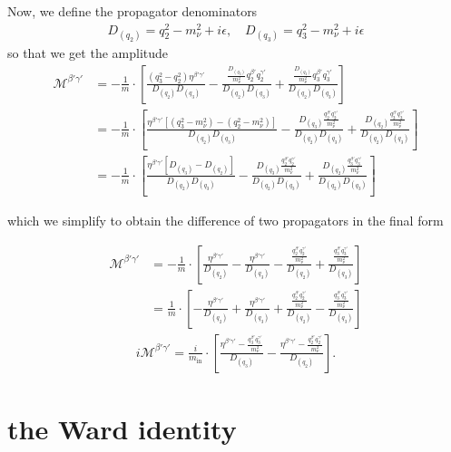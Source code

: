 \documentclass[12pt]{article}
\numberwithin{figure}{section}
\numberwithin{table}{section}
\newcommand{\eps}{\epsilon}
\newcommand{\paren}[1]{\left(#1\right)}
\newcommand{\bracket}[1]{\left[#1\right]}
\begin{document}
Now, we define the propagator denominators
\begin{align*}
\boxed{
D_{(q_2)} = q_2^2-m_\nu^2+i\eps, \quad D_{(q_3)} = q_3^2-m_\nu^2+i\eps}
\end{align*}
so that we get the amplitude
\begin{align*}
     \mathcal{M}^{\beta'\gamma'}&=  -\frac{1}{m}\cdot \bracket{\frac{\paren{q_3^2-q_2^2}\eta^{\beta'\gamma'} }{D_{(q_2)}D_{(q_3)}} -  \frac{\frac{D_{(q_3)}}{m_\nu^2}  q_2^{\beta'}q_2^{\gamma'}  }{D_{(q_2)}D_{(q_3)}} + \frac{\frac{D_{(q_2)}}{m_\nu^2}  q_3^{\beta'}q_3^{\gamma'}  }{D_{(q_2)}D_{(q_3)}}}\\
    &= -\frac{1}{m}\cdot \bracket{\frac{\eta^{\beta'\gamma'}\bracket{(q_3^2-m_\nu^2)-(q_2^2-m_\nu^2)}}{D_{(q_2)}D_{(q_3)} }-\frac{D_{(q_3)}\frac{q_2^{\beta'}q_2^{\gamma'}}{m_\nu^2}    }{D_{(q_2)}D_{(q_3)}} +\frac{D_{(q_2)}\frac{q_3^{\beta'}q_3^{\gamma'}}{m_\nu^2}    }{D_{(q_2)}D_{(q_3)}}}\\
  &= -\frac{1}{m}\cdot \bracket{\frac{\eta^{\beta'\gamma'}\bracket{D_{(q_3)}-D_{(q_2)}}}{D_{(q_2)}D_{(q_3)} }-\frac{D_{(q_3)}\frac{q_2^{\beta'}q_2^{\gamma'}}{m_\nu^2}    }{D_{(q_2)}D_{(q_3)}} +\frac{D_{(q_2)}\frac{q_3^{\beta'}q_3^{\gamma'}}{m_\nu^2}    }{D_{(q_2)}D_{(q_3)}}}
\end{align*}

which we simplify  to obtain the difference of two propagators in the final form

\begin{align*}
      \mathcal{M}^{\beta'\gamma'}&=-\frac{1}{m}\cdot \bracket{\frac{\eta^{\beta'\gamma'}}{D_{(q_2)} }- \frac{\eta^{\beta'\gamma'}}{D_{(q_3)}}-\frac{\frac{q_2^{\beta'}q_2^{\gamma'}}{m_\nu^2}    }{D_{(q_2)}} +\frac{\frac{q_3^{\beta'}q_3^{\gamma'}}{m_\nu^2}    }{D_{(q_3)}}}\\
      &= \frac{1}{m}\cdot \bracket{-\frac{\eta^{\beta'\gamma'}}{D_{(q_2)} }+\frac{\eta^{\beta'\gamma'}}{D_{(q_3)}}+\frac{\frac{q_2^{\beta'}q_2^{\gamma'}}{m_\nu^2}    }{D_{(q_2)}} -\frac{\frac{q_3^{\beta'}q_3^{\gamma'}}{m_\nu^2}    }{D_{(q_3)}}}
\end{align*}
\begin{align*}
\boxed{
 i\mathcal{M}^{\beta'\gamma'}= \frac{i}{m_{\text{in}}}\cdot \bracket{\frac{\eta^{\beta'\gamma'}-\frac{q_3^{\beta'}q_3^{\gamma'}}{m_\nu^2} }{D_{(q_3)}}   -  \frac{\eta^{\beta'\gamma'}-\frac{q_2^{\beta'}q_2^{\gamma'}}{m_\nu^2} }{D_{(q_2)}} }}.
\end{align*}

\newpage

\section{the Ward identity}
\end{document}
